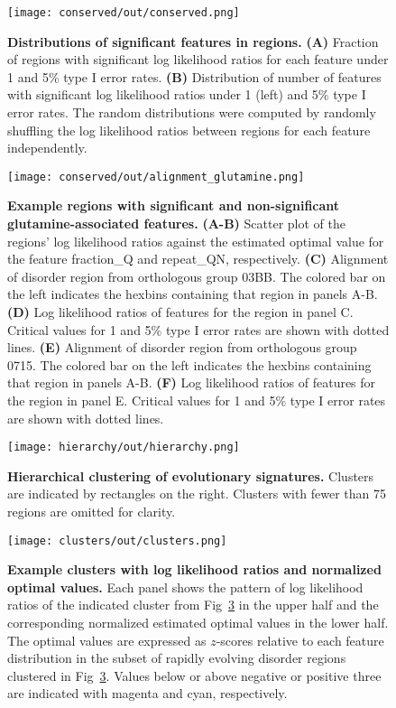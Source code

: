 \begin{figure}[h!]
\texttt{[image: conserved/out/conserved.png]}
\centering
\caption{\textbf{Distributions of significant features in regions.}
\textbf{(A)} Fraction of regions with significant log likelihood ratios for each feature under 1 and 5\% type I error rates.
\textbf{(B)} Distribution of number of features with significant log likelihood ratios under 1 (left) and 5\% type I error rates. The random distributions were computed by randomly shuffling the log likelihood ratios between regions for each feature independently.}
\label{fig:conserved}
\end{figure}

\begin{figure}[h!]
\texttt{[image: conserved/out/alignment\_glutamine.png]}
\centering
\caption{\textbf{Example regions with significant and non-significant glutamine-associated features.}
\textbf{(A-B)} Scatter plot of the regions' log likelihood ratios against the estimated optimal value for the feature fraction\_Q and repeat\_QN, respectively.
\textbf{(C)} Alignment of disorder region from orthologous group 03BB. The colored bar on the left indicates the hexbins containing that region in panels A-B.
\textbf{(D)} Log likelihood ratios of features for the region in panel C. Critical values for 1 and 5\% type I error rates are shown with dotted lines.
\textbf{(E)} Alignment of disorder region from orthologous group 0715. The colored bar on the left indicates the hexbins containing that region in panels A-B.
\textbf{(F)} Log likelihood ratios of features for the region in panel E. Critical values for 1 and 5\% type I error rates are shown with dotted lines.}
\label{fig:alignment}
\end{figure}

\begin{figure}[h!]
\texttt{[image: hierarchy/out/hierarchy.png]}
\centering
\caption{\textbf{Hierarchical clustering of evolutionary signatures.}
Clusters are indicated by rectangles on the right. Clusters with fewer than 75 regions are omitted for clarity.}
\label{fig:hierarchy}
\end{figure}

\begin{figure}[h!]
\texttt{[image: clusters/out/clusters.png]}
\centering
\caption{\textbf{Example clusters with log likelihood ratios and normalized optimal values.}
Each panel shows the pattern of log likelihood ratios of the indicated cluster from Fig~\ref{fig:hierarchy} in the upper half and the corresponding normalized estimated optimal values in the lower half. The optimal values are expressed as $z$-scores relative to each feature distribution in the subset of rapidly evolving disorder regions clustered in Fig~\ref{fig:hierarchy}. Values below or above negative or positive three are indicated with magenta and cyan, respectively.}
\label{fig:clusters}
\end{figure}
